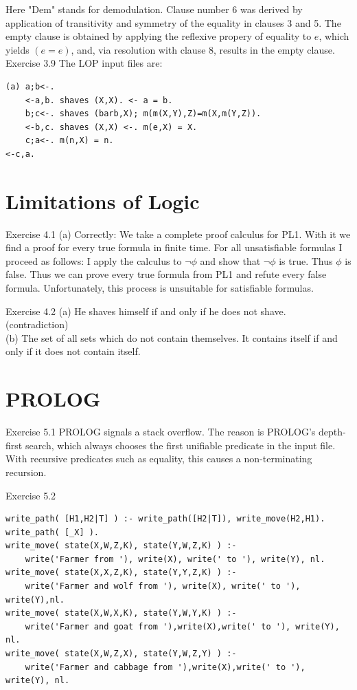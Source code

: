 \documentclass[10pt]{book}
\begin{document}
Here "Dem" stands for demodulation. Clause number 6 was derived by application of transitivity and symmetry of the equality in clauses 3 and 5. The empty clause is obtained by applying the reflexive propery of equality to $e$, which yields $(e=e)$, and, via resolution with clause 8, results in the empty clause.\\
Exercise 3.9 The LOP input files are:

\begin{verbatim}
(a) a;b<-.
    <-a,b. shaves (X,X). <- a = b.
    b;c<-. shaves (barb,X); m(m(X,Y),Z)=m(X,m(Y,Z)).
    <-b,c. shaves (X,X) <-. m(e,X) = X.
    c;a<-. m(n,X) = n.
<-c,a.
\end{verbatim}

\section{Limitations of Logic}
Exercise 4.1
(a) Correctly: We take a complete proof calculus for PL1. With it we find a proof for every true formula in finite time. For all unsatisfiable formulas I proceed as follows: I apply the calculus to $\neg \phi$ and show that $\neg \phi$ is true. Thus $\phi$ is false. Thus we can prove every true formula from PL1 and refute every false formula. Unfortunately, this process is unsuitable for satisfiable formulas.

Exercise 4.2
(a) He shaves himself if and only if he does not shave. (contradiction)\\
(b) The set of all sets which do not contain themselves. It contains itself if and only if it does not contain itself.

\section{PROLOG}
Exercise 5.1 PROLOG signals a stack overflow. The reason is PROLOG's depth-first search, which always chooses the first unifiable predicate in the input file. With recursive predicates such as equality, this causes a non-terminating recursion.

Exercise 5.2
\begin{verbatim}
write_path( [H1,H2|T] ) :- write_path([H2|T]), write_move(H2,H1).
write_path( [_X] ).
write_move( state(X,W,Z,K), state(Y,W,Z,K) ) :-
    write('Farmer from '), write(X), write(' to '), write(Y), nl.
write_move( state(X,X,Z,K), state(Y,Y,Z,K) ) :-
    write('Farmer and wolf from '), write(X), write(' to '), write(Y),nl.
write_move( state(X,W,X,K), state(Y,W,Y,K) ) :-
    write('Farmer and goat from '),write(X),write(' to '), write(Y), nl.
write_move( state(X,W,Z,X), state(Y,W,Z,Y) ) :-
    write('Farmer and cabbage from '),write(X),write(' to '), write(Y), nl.
\end{verbatim}
\end{document}
